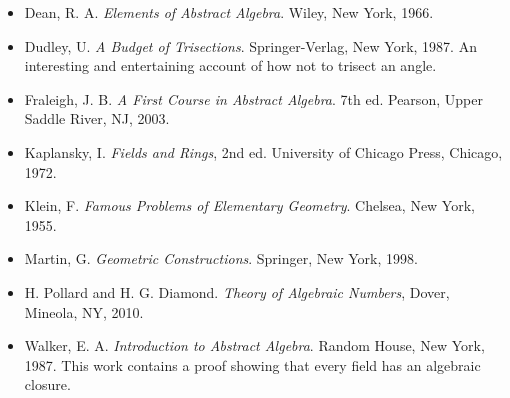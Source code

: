 {\small
\begin{itemize}



 
\item[{\bf [1]}] %
Dean, R. A. {\it Elements of Abstract Algebra}. Wiley, New
York, 1966.

\item[{\bf [2]}] %
Dudley, U. {\it A Budget of Trisections}. Springer-Verlag, New
York, 1987. An interesting and entertaining account of how not to 
trisect an angle.

\item[{ \bf [3]}] %
Fraleigh, J. B. 
{\it A First Course in Abstract Algebra}. 7th ed.
Pearson, Upper Saddle River, NJ, 2003. 
 
\item[{\bf [4]}] %
Kaplansky, I. {\it Fields and Rings}, 2nd ed. University of Chicago
Press, Chicago, 1972. 
 
\item[{\bf [5]}] %
Klein, F. {\it Famous Problems of Elementary Geometry}.
Chelsea, New York, 1955.

\item[{\bf [6]}] %
Martin, G.
{\it Geometric Constructions}.
Springer, New York, 1998.

\item[{\bf [7]}] %
H. Pollard and H. G. Diamond. {\it  Theory of Algebraic Numbers},
Dover, Mineola, NY, 2010.

\item[{\bf [8]}] %
Walker, E. A. {\it Introduction to Abstract Algebra}. Random House, 
New York, 1987. This work contains a proof showing that every 
field has an algebraic closure.
 
\end{itemize}
}





